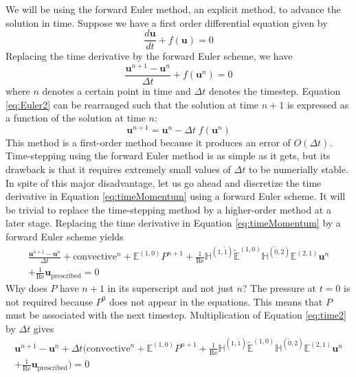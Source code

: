 We will be using the forward Euler method, an explicit method, to advance the solution in time. Suppose we have a first order differential equation given by
\begin{equation}
    \label{eq:Euler1}
    \frac{d \mathbf{u}}{dt} + f(\mathbf{u}) = 0
\end{equation}
Replacing the time derivative by the forward Euler scheme, we have
\begin{equation}
    \label{eq:Euler2}
    \frac{\mathbf{u}^{n+1} - \mathbf{u}^{n}}{\Delta t} + f(\mathbf{u}^{n}) = 0
\end{equation}
where $n$ denotes a certain point in time and $\Delta t$ denotes the timestep. Equation \eqref{eq:Euler2} can be rearranged such that the solution at time $n+1$ is expressed as a function of the solution at time $n$:
\begin{equation}
    \label{eq:time1}
    \mathbf{u}^{n+1} = \mathbf{u}^{n} - \Delta t \; f(\mathbf{u}^{n})
\end{equation}
This method is a first-order method because it produces an error of $O(\Delta t)$. Time-stepping using the forward Euler method is as simple as it gets, but its drawback is that it requires extremely small values of $\Delta t$ to be numerially stable. In spite of this major disadvantage, let us go ahead and discretize the time derivative in Equation \eqref{eq:timeMomentum} using a forward Euler scheme. It will be trivial to replace the time-stepping method by a higher-order method at a later stage. Replacing the time derivative in Equation \eqref{eq:timeMomentum} by a forward Euler scheme yields
\begin{multline}
    \label{eq:time2}
    \frac{\mathbf{u}^{n+1} - \mathbf{u}^{n}}{\Delta t} + \text{convective}^{n} + \mathbb{E}^{(1,0)} P^{n+1} + \frac{1}{\text{Re}} \mathbb{H}^{(1,\tilde{1})} \tilde{\mathbb{E}}^{(1,0)} \mathbb{H}^{(\tilde{0},2)} \mathbb{E}^{(2,1)} \mathbf{u}^{n} \\
    + \frac{1}{\text{Re}} \mathbf{u}_{\text{prescribed}} = 0
\end{multline}
Why does $P$ have $n + 1$ in its superscript and not just $n$? The pressure at $t = 0$ is not required because $P^0$ does not appear in the equations. This means that $P$ must be associated with the next timestep. Multiplication of Equation \eqref{eq:time2} by $\Delta t$ gives
\begin{multline}
    \label{eq:time3}
    \mathbf{u}^{n+1} - \mathbf{u}^{n} + \Delta t \biggl( \text{convective}^{n} + \mathbb{E}^{(1,0)} P^{n+1} + \frac{1}{\text{Re}} \mathbb{H}^{(1,\tilde{1})} \tilde{\mathbb{E}}^{(1,0)} \mathbb{H}^{(\tilde{0},2)} \mathbb{E}^{(2,1)} \mathbf{u}^{n} \\
    + \frac{1}{\text{Re}} \mathbf{u}_{\text{prescribed}} \biggr) = 0
\end{multline}
